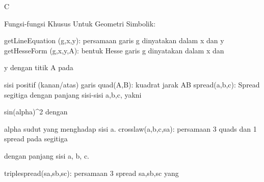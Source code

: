 \documentclass[a4paper,10pt]{article}
\begin{document}
\begin{eulernotebook}
\begin{eulercomment}
\begin{eulercomment}
\begin{eulercomment}
\begin{eulercomment}
\begin{eulercomment}
\begin{eulercomment}
\begin{eulercomment}
\begin{eulercomment}
\begin{eulercomment}
\begin{eulercomment}
\begin{eulercomment}
\begin{eulercomment}
\begin{eulercomment}
\begin{eulercomment}
\begin{eulercomment}
\begin{eulercomment}
\begin{eulercomment}
\begin{eulercomment}
\begin{eulercomment}
\begin{eulercomment}
\begin{eulercomment}
\begin{eulercomment}
\begin{eulercomment}
\begin{eulercomment}
\begin{eulercomment}
\begin{eulercomment}
\begin{eulercomment}
\begin{eulercomment}
\begin{eulercomment}
\begin{eulercomment}
\begin{eulercomment}
\begin{eulercomment}
\begin{eulercomment}
\begin{eulercomment}
\begin{eulercomment}
\begin{eulercomment}
\begin{eulercomment}
\begin{eulercomment}
\begin{eulercomment}
\begin{eulercomment}
\begin{eulercomment}
\begin{eulercomment}
\begin{eulercomment}
\begin{eulercomment}
\begin{eulercomment}
\begin{eulercomment}
\begin{eulercomment}
\begin{eulercomment}
\begin{eulercomment}
\begin{eulercomment}
\begin{eulercomment}
\begin{eulercomment}
\begin{eulercomment}
\begin{eulercomment}
\begin{eulercomment}
\begin{eulercomment}
\begin{eulercomment}
\begin{eulercomment}
\begin{eulercomment}
\begin{eulercomment}
\begin{eulercomment}
\begin{eulercomment}
\begin{eulerttcomment}
C
\end{eulerttcomment}
\begin{eulercomment}

Fungsi-fungsi Khusus Untuk Geometri Simbolik:

\end{eulercomment}
\begin{eulerttcomment}
  getLineEquation (g,x,y): persamaan garis g dinyatakan dalam x dan y
  getHesseForm (g,x,y,A): bentuk Hesse garis g dinyatakan dalam x dan
\end{eulerttcomment}
\begin{eulercomment}
y dengan titik A pada\\
\end{eulercomment}
\begin{eulerttcomment}
  sisi positif (kanan/atas) garis
  quad(A,B): kuadrat jarak AB
  spread(a,b,c): Spread segitiga dengan panjang sisi-sisi a,b,c, yakni
\end{eulerttcomment}
\begin{eulercomment}
sin(alpha)\textasciicircum{}2 dengan\\
\end{eulercomment}
\begin{eulerttcomment}
  alpha sudut yang menghadap sisi a.
  crosslaw(a,b,c,sa): persamaan 3 quads dan 1 spread pada segitiga
\end{eulerttcomment}
\begin{eulercomment}
dengan panjang sisi a, b, c.\\
\end{eulercomment}
\begin{eulerttcomment}
  triplespread(sa,sb,sc): persamaan 3 spread sa,sb,sc yang 
\end{eulerttcomment}
\end{eulercomment}
\end{eulercomment}
\end{eulercomment}
\end{eulercomment}
\end{eulercomment}
\end{eulercomment}
\end{eulercomment}
\end{eulercomment}
\end{eulercomment}
\end{eulercomment}
\end{eulercomment}
\end{eulercomment}
\end{eulercomment}
\end{eulercomment}
\end{eulercomment}
\end{eulercomment}
\end{eulercomment}
\end{eulercomment}
\end{eulercomment}
\end{eulercomment}
\end{eulercomment}
\end{eulercomment}
\end{eulercomment}
\end{eulercomment}
\end{eulercomment}
\end{eulercomment}
\end{eulercomment}
\end{eulercomment}
\end{eulercomment}
\end{eulercomment}
\end{eulercomment}
\end{eulercomment}
\end{eulercomment}
\end{eulercomment}
\end{eulercomment}
\end{eulercomment}
\end{eulercomment}
\end{eulercomment}
\end{eulercomment}
\end{eulercomment}
\end{eulercomment}
\end{eulercomment}
\end{eulercomment}
\end{eulercomment}
\end{eulercomment}
\end{eulercomment}
\end{eulercomment}
\end{eulercomment}
\end{eulercomment}
\end{eulercomment}
\end{eulercomment}
\end{eulercomment}
\end{eulercomment}
\end{eulercomment}
\end{eulercomment}
\end{eulercomment}
\end{eulercomment}
\end{eulercomment}
\end{eulercomment}
\end{eulercomment}
\end{eulercomment}
\end{eulercomment}
\end{eulernotebook}
\end{document}
